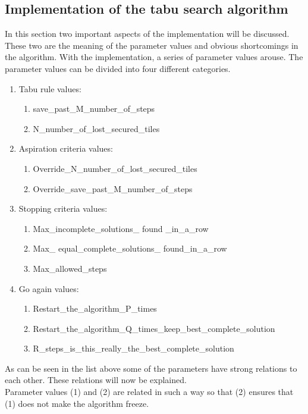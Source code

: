 \subsection{Implementation of the tabu search algorithm}
In this section two important aspects of the implementation will be discussed. These two are the meaning of the parameter values and obvious shortcomings in the algorithm. With the implementation, a series of parameter values arouse. The parameter values can be divided into four different categories.
\begin{enumerate}
\item{} Tabu rule values:
\begin{enumerate}
\item{} save\_past\_M\_number\_of\_steps
\item{} N\_number\_of\_lost\_secured\_tiles
\end{enumerate} 
\item{} Aspiration criteria values:
\begin{enumerate}
\item{} Override\_N\_number\_of\_lost\_secured\_tiles
\item{} Override\_save\_past\_M\_number\_of\_steps
\end{enumerate} 
\item{} Stopping criteria values:
\begin{enumerate}
\item{} Max\_incomplete\_solutions\_ found \_in\_a\_row
\item{} Max\_ equal\_complete\_solutions\_ found\_in\_a\_row
\item{} Max\_allowed\_steps
\end{enumerate} 
\item{} Go again values:
\begin{enumerate}
\item{} Restart\_the\_algorithm\_P\_times
\item{} Restart\_the\_algorithm\_Q\_times\_keep\_best\_complete\_solution
\item{} R\_steps\_is\_this\_really\_the\_best\_complete\_solution
\end{enumerate} 
\end{enumerate} 
As can be seen in the list above some of the parameters have strong relations to each other. These relations will now be explained. \\
Parameter values (1) and (2) are related in such a way so that (2) ensures that (1) does not make the algorithm freeze. \\
